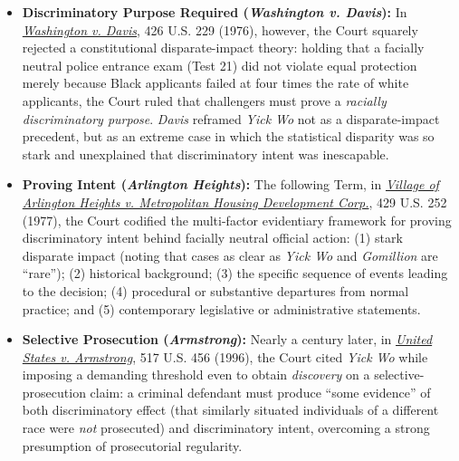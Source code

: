 \documentclass[12pt]{article}
\begin{document}
\begin{itemize}

\item \textbf{Discriminatory Purpose Required (\textit{Washington v. Davis}):} In \href{https://supreme.justia.com/cases/federal/us/426/229/}{\emph{Washington v. Davis}}, 426 U.S. 229 (1976), however, the Court squarely rejected a constitutional disparate-impact theory: holding that a facially neutral police entrance exam (Test 21) did not violate equal protection merely because Black applicants failed at four times the rate of white applicants, the Court ruled that challengers must prove a \emph{racially discriminatory purpose}. \emph{Davis} reframed \emph{Yick Wo} not as a disparate-impact precedent, but as an extreme case in which the statistical disparity was so stark and unexplained that discriminatory intent was inescapable.

\item \textbf{Proving Intent (\textit{Arlington Heights}):} The following Term, in \href{https://supreme.justia.com/cases/federal/us/429/252/}{\emph{Village of Arlington Heights v. Metropolitan Housing Development Corp.}}, 429 U.S. 252 (1977), the Court codified the multi-factor evidentiary framework for proving discriminatory intent behind facially neutral official action: (1) stark disparate impact (noting that cases as clear as \emph{Yick Wo} and \emph{Gomillion} are ``rare''); (2) historical background; (3) the specific sequence of events leading to the decision; (4) procedural or substantive departures from normal practice; and (5) contemporary legislative or administrative statements.

\item \textbf{Selective Prosecution (\textit{Armstrong}):} Nearly a century later, in \href{https://supreme.justia.com/cases/federal/us/517/456/}{\emph{United States v. Armstrong}}, 517 U.S. 456 (1996), the Court cited \emph{Yick Wo} while imposing a demanding threshold even to obtain \emph{discovery} on a selective-prosecution claim: a criminal defendant must produce ``some evidence'' of both discriminatory effect (that similarly situated individuals of a different race were \emph{not} prosecuted) and discriminatory intent, overcoming a strong presumption of prosecutorial regularity.

\end{itemize}
\end{document}
